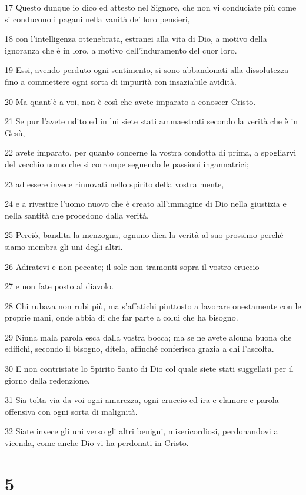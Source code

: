 \par 17 Questo dunque io dico ed attesto nel Signore, che non vi conduciate più come si conducono i pagani nella vanità de' loro pensieri,
\par 18 con l'intelligenza ottenebrata, estranei alla vita di Dio, a motivo della ignoranza che è in loro, a motivo dell'induramento del cuor loro.
\par 19 Essi, avendo perduto ogni sentimento, si sono abbandonati alla dissolutezza fino a commettere ogni sorta di impurità con insaziabile avidità.
\par 20 Ma quant'è a voi, non è così che avete imparato a conoscer Cristo.
\par 21 Se pur l'avete udito ed in lui siete stati ammaestrati secondo la verità che è in Gesù,
\par 22 avete imparato, per quanto concerne la vostra condotta di prima, a spogliarvi del vecchio uomo che si corrompe seguendo le passioni ingannatrici;
\par 23 ad essere invece rinnovati nello spirito della vostra mente,
\par 24 e a rivestire l'uomo nuovo che è creato all'immagine di Dio nella giustizia e nella santità che procedono dalla verità.
\par 25 Perciò, bandita la menzogna, ognuno dica la verità al suo prossimo perché siamo membra gli uni degli altri.
\par 26 Adiratevi e non peccate; il sole non tramonti sopra il vostro cruccio
\par 27 e non fate posto al diavolo.
\par 28 Chi rubava non rubi più, ma s'affatichi piuttosto a lavorare onestamente con le proprie mani, onde abbia di che far parte a colui che ha bisogno.
\par 29 Niuna mala parola esca dalla vostra bocca; ma se ne avete alcuna buona che edifichi, secondo il bisogno, ditela, affinché conferisca grazia a chi l'ascolta.
\par 30 E non contristate lo Spirito Santo di Dio col quale siete stati suggellati per il giorno della redenzione.
\par 31 Sia tolta via da voi ogni amarezza, ogni cruccio ed ira e clamore e parola offensiva con ogni sorta di malignità.
\par 32 Siate invece gli uni verso gli altri benigni, misericordiosi, perdonandovi a vicenda, come anche Dio vi ha perdonati in Cristo.

\chapter{5}

